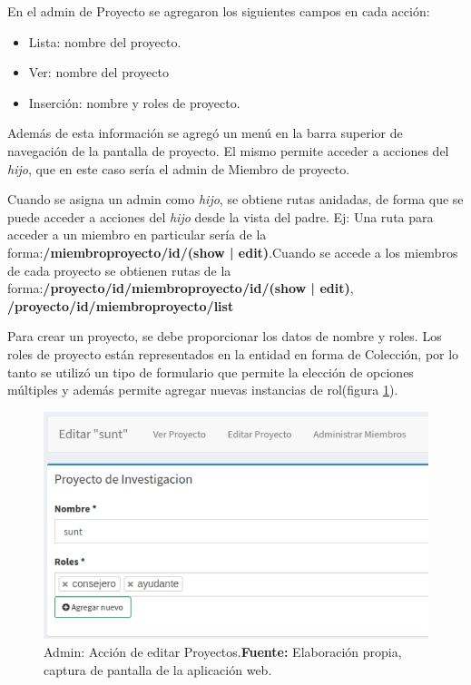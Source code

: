 \documentclass{article}
\begin{document}
En el admin de Proyecto se agregaron los siguientes campos en cada acción:

\begin{itemize}
    \item Lista: nombre del proyecto.
    \item Ver: nombre del proyecto
    \item Inserción: nombre y roles de proyecto.
\end{itemize}

Además de esta información se agregó un menú en la barra superior de navegación de la pantalla de proyecto. El mismo permite acceder a acciones del \textit{hijo},
que en este caso sería el admin de Miembro de proyecto.

Cuando se asigna un admin como \textit{hijo}, se obtiene rutas anidadas, de forma que se puede acceder a acciones del \textit{hijo} desde la vista del padre. Ej: Una ruta
para acceder a un miembro en particular sería de la forma:\newline \textbf{/miembroproyecto/{id}/(show | edit)}\@.\newline\newline Cuando se accede a los miembros de cada proyecto se obtienen rutas de la forma:\newline \textbf{/proyecto/{id}/miembroproyecto/{id}/(show | edit)},
\newline \textbf{/proyecto/{id}/miembroproyecto/list}\newline

Para crear un proyecto, se debe proporcionar los datos de nombre y roles. Los roles de proyecto están representados en la entidad en forma de Colección,
por lo tanto se utilizó un tipo de formulario que permite la elección de opciones múltiples y además permite agregar nuevas instancias de
rol(figura \ref{fig:image/proyecto-editar}).

\begin{figure}[h]
    \includegraphics[width=1\linewidth]{image/proyecto-editar.png}
    \caption{Admin: Acción de  editar Proyectos.\newline \textbf{Fuente:} Elaboración propia, captura de pantalla de la aplicación web.}
    \label{fig:image/proyecto-editar}
\end{figure}
\end{document}
